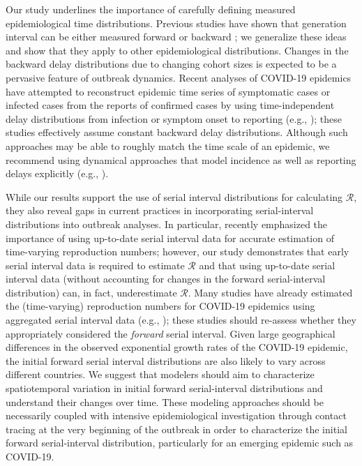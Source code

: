 \documentclass[12pt]{article}
\newcommand{\RR}{\ensuremath{{\mathcal R}}\xspace}
\begin{document}
Our study underlines the importance of carefully defining measured epidemiological time distributions.
Previous studies have shown that generation interval can be either measured forward or backward \citep{nishiura2010time,champredon2015intrinsic,britton2019estimation};
we generalize these ideas and show that they apply to other epidemiological distributions.
Changes in the backward delay distributions due to changing cohort sizes is expected to be a pervasive feature of outbreak dynamics.
Recent analyses of COVID-19 epidemics have attempted to reconstruct epidemic time series of symptomatic cases or infected cases from the reports of confirmed cases by using time-independent delay distributions from infection or symptom onset to reporting (e.g., \cite{tempvar, park2020potential, shim2020transmission});
these studies effectively assume constant backward delay distributions.
Although such approaches may be able to roughly match the time scale of an epidemic, we recommend using dynamical approaches that model incidence as well as reporting delays explicitly (e.g., \citep{flaxman2020estimating}).

While our results support the use of serial interval distributions for calculating \RR, 
they also reveal gaps in current practices in incorporating serial-interval distributions into outbreak analyses.
In particular, \cite{thompson2019improved} recently emphasized the importance of using up-to-date serial interval data for accurate estimation of time-varying reproduction numbers;
however, our study demonstrates that early serial interval data is required to estimate \RR and that using up-to-date serial interval data (without accounting for changes in the forward serial-interval distribution) can, in fact, underestimate \RR.
Many studies have already estimated the (time-varying) reproduction numbers for COVID-19 epidemics using aggregated serial interval data (e.g., \cite{tempvar,du2020serial,pan2020jama,zhang2020evolving});
these studies should re-assess whether they appropriately considered the \emph{forward} serial interval.
Given large geographical differences in the observed exponential growth rates of the COVID-19 epidemic, the initial forward serial interval distributions are also likely to vary across different countries.
We suggest that modelers should aim to characterize spatiotemporal variation in initial forward serial-interval distributions and understand their changes over time.
These modeling approaches should be necessarily coupled with intensive epidemiological investigation through contact tracing at the very beginning of the outbreak in order to characterize the initial forward serial-interval distribution, particularly for an emerging epidemic such as COVID-19.
\end{document}
